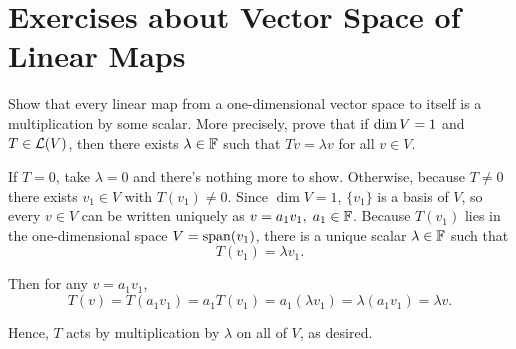\section*{Exercises about Vector Space of Linear Maps}

\begin{xrcs}
  Show that every linear map from a one-dimensional vector space to itself is a multiplication by some scalar. More precisely, prove that if $\operatorname{dim} V = 1$ and $T \in \mathcal{L} (V)$, then there exists $\lambda \in \mathbb{F}$ such that $Tv = \lambda v$ for all $v \in V$.

  \begin{xprf}
    If $T = 0$, take $\lambda = 0$ and there's nothing more to show. Otherwise, because $T \neq 0$ there exists $v_1 \in V$ with $T(v_1) \neq 0$. Since $\dim V = 1$, $\{v_1\}$ is a basis of $V$, so every $v \in V$ can be written uniquely as $v=a_1 v_1, \; a_1 \in \mathbb{F}$. Because $T(v_1)$ lies in the one-dimensional space $V=\operatorname{span} (v_1)$, there is a unique scalar $\lambda \in \mathbb{F}$ such that
    \begin{equation}
      T(v_1) = \lambda v_1.
    \end{equation}

    Then for any $v = a_1 v_1$,
    \begin{equation}
      T(v) = T(a_1 v_1) = a_1 T(v_1) = a_1 (\lambda v_1) = \lambda (a_1 v_1) = \lambda v.
    \end{equation}

    Hence, $T$ acts by multiplication by $\lambda$ on all of $V$, as desired.
  \end{xprf}
\end{xrcs}


